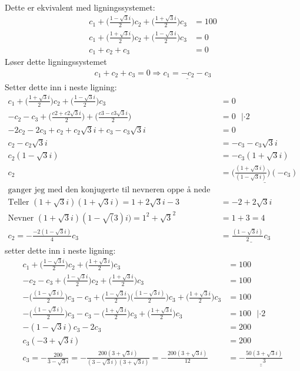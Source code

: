 \documentclass[a4paper,12pt,norsk]{article}
\begin{document}
 Dette er ekvivalent med ligningssystemet:
 \begin{align*}
 c_1 + \Big(\frac{1-\sqrt{3}i}{2}\Big)c_2 + \Big(\frac{1+\sqrt{3}i}{2}\Big)c_3 &= 100\\
 c_1 + \Big(\frac{1+\sqrt{3}i}{2}\Big)c_2 + \Big(\frac{1-\sqrt{3}i}{2}\Big)c_3 &= 0\\
 c_1 + c_2 + c_3 &= 0
 \end{align*} 
Løser dette ligningssystemet
\begin{align*}
c_1 + c_2 + c_3 = 0 \Rightarrow \underline{c_1 = -c_2 -c_3}
\end{align*}
Setter dette inn i neste ligning:
\begin{align*}
 c_1 + \Big(\frac{1+\sqrt{3}i}{2}\Big)c_2 + \Big(\frac{1-\sqrt{3}i}{2}\Big)c_3 &= 0\\
 -c_2 -c_3 + \Big(\frac{c2+c2\sqrt{3}i}{2}\Big) + \Big(\frac{c3-c3\sqrt{3}i}{2}\Big) &= 0 \textbf{ }|\cdot2\\
 -2c_2 - 2c_3 +c_2 +c_2\sqrt{3}i + c_3 - c_3\sqrt{3}i &= 0\\
 c_2 - c_2\sqrt{3}i &= -c_3 - c_3\sqrt{3}i\\
 c_2(1 -\sqrt{3}i) &= -c_3(1 + \sqrt{3}i)\\
 c_2 &= \underline{\Bigg(\frac{(1 + \sqrt{3}i)}{(1 -\sqrt{3}i)}\Bigg)(-c_3)}\\
 \text{ganger jeg med den konjugerte til nevneren oppe å nede får jeg}\\
 \text{Teller }(1+\sqrt{3}i)(1+\sqrt{3}i) = 1 + 2\sqrt{3}i -3 &= -2 + 2\sqrt{3}i\\
 \text{Nevner }(1+\sqrt{3}i)(1-\sqrt(3)i) = 1^2 + \sqrt{3}^2 &= 1 + 3 = 4 \\
 c_2 = -\frac{-2(1 - \sqrt{3}i)}{4}c_3 &= \underline{\frac{(1 - \sqrt{3}i)}{2}c_3}
\end{align*}
setter dette inn i neste ligning:
\begin{align*}
 c_1 + \Big(\frac{1-\sqrt{3}i}{2}\Big)c_2 + \Big(\frac{1+\sqrt{3}i}{2}\Big)c_3 &= 100\\
-c_2-c_3 + \Big(\frac{1-\sqrt{3}i}{2}\Big)c_2 + \Big(\frac{1+\sqrt{3}i}{2}\Big)c_3 &= 100\\
-\Big(\frac{(1 - \sqrt{3}i)}{2}\Big)c_3-c_3 + \Big(\frac{1-\sqrt{3}i}{2}\Big)\Big(\frac{(1 - \sqrt{3}i)}{2}\Big)c_3 + \Big(\frac{1+\sqrt{3}i}{2}\Big)c_3 &= 100\\
-\Big(\frac{(1 - \sqrt{3}i)}{2}\Big)c_3-c_3 - \Big(\frac{1+\sqrt{3}i}{2}\Big)c_3 + \Big(\frac{1+\sqrt{3}i}{2}\Big)c_3 &= 100 \text{ } |\cdot 2\\
-(1-\sqrt{3}i)c_3 - 2c_3 &= 200\\
c_3(-3+\sqrt{3}i) &= 200\\
c_3 = -\frac{200}{3-\sqrt{3}i} = -\frac{200(3+\sqrt{3}i)}{(3 - \sqrt{3}i)( 3 + \sqrt{3}i)} = -\frac{200(3 +\sqrt{3}i)}{12} &= \underline{\underline{- \frac{50(3+\sqrt{3}i)}{3}}}
\end{align*}
\end{document}
